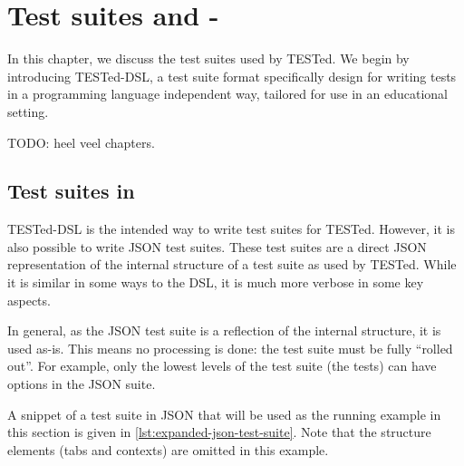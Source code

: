 \documentclass[../main]{subfiles}
\begin{document}
\chapter{Test suites and \tested-\dsl}\label{ch:test-suites-and-tested-dsl}

In this chapter, we discuss the test suites used by TESTed.
We begin by introducing TESTed-DSL, a test suite format specifically design for writing tests in a programming language independent way, tailored for use in an educational setting.

TODO: heel veel chapters.

\section{Test suites in \tested}\label{sec:test-suites-in-tested}

TESTed-DSL is the intended way to write test suites for TESTed.
However, it is also possible to write JSON test suites.
These test suites are a direct JSON representation of the internal structure of a test suite as used by TESTed.
While it is similar in some ways to the DSL, it is much more verbose in some key aspects.

In general, as the JSON test suite is a reflection of the internal structure, it is used as-is.
This means no processing is done: the test suite must be fully ``rolled out''.
For example, only the lowest levels of the test suite (the tests) can have options in the JSON suite.

A snippet of a test suite in JSON that will be used as the running example in this section is given in \cref{lst:expanded-json-test-suite}.
Note that the structure elements (tabs and contexts) are omitted in this example.

\end{document}
